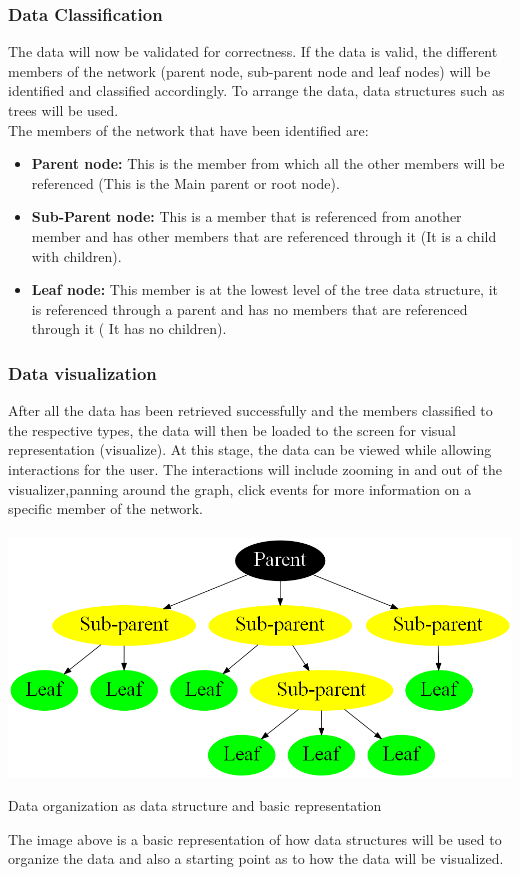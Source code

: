 \documentclass[a4paper,12pt]{article}
\begin{document}
\subsubsection{Data Classification}
The data will now be validated for correctness. If the data is valid, the different members of the network (parent node, sub-parent node and leaf nodes)
will be identified and classified accordingly. To arrange the data, data structures such as trees will be used.\\
The members of the network that have been identified are:
\begin{itemize}
	\item \textbf{Parent node:} This is the member from which all the other members will be referenced (This is the Main parent or root node).
	\item \textbf{Sub-Parent node:} This is a member that is referenced from another member and has other members that are referenced through it (It is a child with children).
	\item \textbf{Leaf node:} This member is at the lowest level of the tree data structure, it is referenced through a parent and has no members that are referenced through it ( It has no children).
\end{itemize}
\newpage
\subsubsection{Data visualization}
After all the data has been retrieved successfully and the members classified to the respective types, the data will then be loaded to the screen for visual representation (visualize). At this stage, the data can be viewed while allowing interactions for the user. The interactions will include zooming in and out of the visualizer,panning around the graph, click events for more information on a specific member of the network.\\ \\
\includegraphics[width=\textwidth]{images/graph1.png}
\begin{center}
Data organization as data structure and basic representation
\end{center}
The image above is a basic representation of how data structures will be used to organize the data and also a starting point as to how the data will be visualized.
\end{document}
